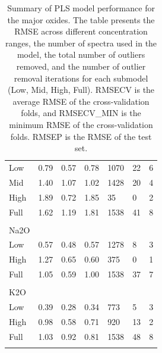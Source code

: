 \begin{table}[htbp]
\begin{tabular*}{\textwidth}{@{\extracolsep{\fill}} lllllll}
  Low & 0.79 & 0.57 & 0.78 & 1070 & 22 & 6 \\
  Mid & 1.40 & 1.07 & 1.02 & 1428 & 20 & 4 \\
  High & 1.89 & 0.72 & 1.85 & 35 & 0 & 2 \\
  Full & 1.62 & 1.19 & 1.81 & 1538 & 41 & 8 \\
\\
Na2O &&&&&& \\
  Low & 0.57 & 0.48 & 0.57 & 1278 & 8 & 3 \\
  High & 1.27 & 0.65 & 0.60 & 375 & 0 & 1 \\
  Full & 1.05 & 0.59 & 1.00 & 1538 & 37 & 7 \\
\\
K2O &&&&&& \\
  Low & 0.39 & 0.28 & 0.34 & 773 & 5 & 3 \\
  High & 0.98 & 0.58 & 0.71 & 920 & 13 & 2 \\
  Full & 1.03 & 0.92 & 0.81 & 1538 & 48 & 8 \\
\\

\end{tabular*}
\caption{Summary of PLS model performance for the major oxides. The table presents the RMSE across different concentration ranges, the number of spectra used in the model, the total number of outliers removed, and the number of outlier removal iterations for each submodel (Low, Mid, High, Full). RMSECV is the average RMSE of the cross-validation folds, and RMSECV\_MIN is the minimum RMSE of the cross-validation folds. RMSEP is the RMSE of the test set.}
\label{table:rmsecv_results}
\end{table}






